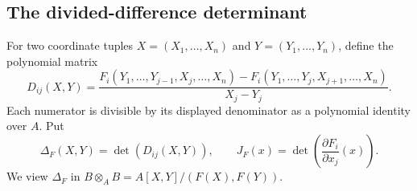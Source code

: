 \documentclass[11pt,letterpaper,oneside]{article}
\numberwithin{equation}{section}
\theoremstyle{definition}
\theoremstyle{remark}\newtheorem{remark}[theorem]{Remark}
\begin{document}
\subsection{The divided-difference determinant}
For two coordinate tuples $X=(X_1,\ldots,X_n)$ and
$Y=(Y_1,\ldots,Y_n)$, define the polynomial matrix
\begin{equation}\label{eq:divideddiffmatrix}
 D_{ij}(X,Y)=
 \frac{F_i(Y_1,\ldots,Y_{j-1},X_j,\ldots,X_n)
       -F_i(Y_1,\ldots,Y_j,X_{j+1},\ldots,X_n)}{X_j-Y_j}.
\end{equation}
Each numerator is divisible by its displayed denominator as a polynomial
identity over $A$. Put
\begin{equation}\label{eq:multibezout}
 \Delta_F(X,Y)=\det(D_{ij}(X,Y)),\qquad
 J_F(x)=\det\left(\frac{\partial F_i}{\partial x_j}(x)\right).
\end{equation}
We view $\Delta_F$ in
$B\otimes_A B=A[X,Y]/(F(X),F(Y))$.
\end{document}
